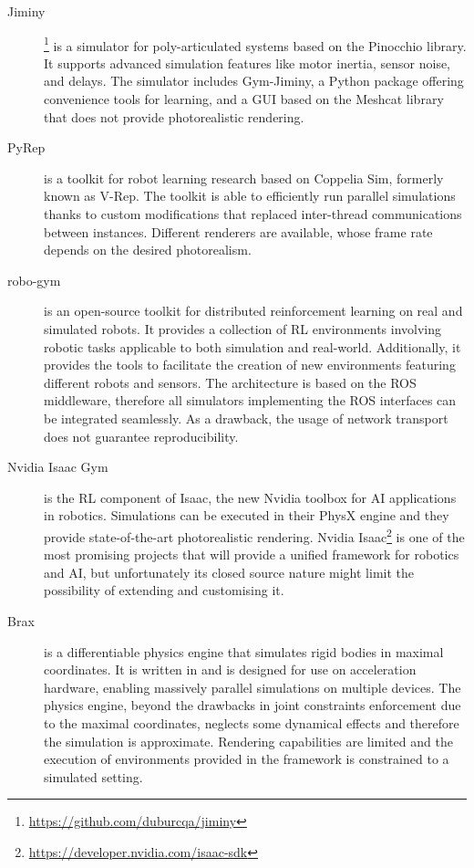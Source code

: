 \begin{description}
\item[Jiminy]\!\!\footnote{\url{https://github.com/duburcqa/jiminy}} is a simulator for poly-articulated systems based on the Pinocchio library.
It supports advanced simulation features like motor inertia, sensor noise, and delays.
The simulator includes Gym-Jiminy, a Python package offering convenience tools for learning, and a \ac{GUI} based on the Meshcat library that does not provide photorealistic rendering.

\item[PyRep]\!\parencite{james_pyrep_2019} is a toolkit for robot learning research based on Coppelia Sim, formerly known as V-Rep.
The toolkit is able to efficiently run parallel simulations thanks to custom modifications that replaced inter-thread communications between instances.
Different renderers are available, whose frame rate depends on the desired photorealism.

\item[robo-gym]\!\parencite{lucchi_robo-gym_2020} is an open-source toolkit for distributed reinforcement learning on real and simulated robots.
It provides a collection of \ac{RL} environments involving robotic tasks applicable to both simulation and real-world.
Additionally, it provides the tools to facilitate the creation of new environments featuring different robots and sensors.
The architecture is based on the ROS middleware, therefore all simulators implementing the ROS interfaces can be integrated seamlessly.
As a drawback, the usage of network transport does not guarantee reproducibility.

\item[Nvidia Isaac Gym]\!\parencite{makoviychuk_isaac_2021}
is the RL component of Isaac, the new Nvidia toolbox for AI applications in robotics.
Simulations can be executed in their PhysX engine and they provide state-of-the-art photorealistic rendering.
Nvidia Isaac\footnote{\url{https://developer.nvidia.com/isaac-sdk}} is one of the most promising projects that will provide a unified framework for robotics and AI, but unfortunately its closed source nature might limit the possibility of extending and customising it.

\item[Brax]\!\parencite{freeman_brax_2021} is a differentiable physics engine that simulates rigid bodies in maximal coordinates.
It is written in \jax and is designed for use on acceleration hardware, enabling massively parallel simulations on multiple devices.
The physics engine, beyond the drawbacks in joint constraints enforcement due to the maximal coordinates, neglects some dynamical effects and therefore the simulation is approximate.
Rendering capabilities are limited and the execution of environments provided in the framework is constrained to a simulated setting.

\end{description}

